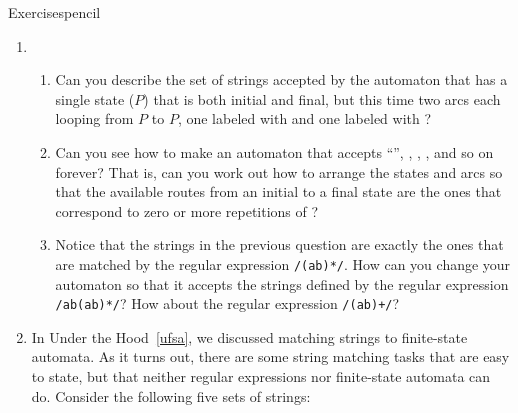 \begin{tblsfilledsymbol}{Exercises}{pencil}
\begin{enumerate}
\begin{enumerate}
    \begin{enumerate}
    \item \verb#egrep 'world.*August.*(holidays)?'#
    \item \verb#egrep 'august hol(i|y)days?'#
    \item \verb#egrep 'holidays|holy days in August'#
    \end{enumerate}
  \end{enumerate}

\item 
  \begin{enumerate}
  \item Can you describe the set of strings accepted by the automaton that has a single state ($P$) that is both initial and final, but  this time two arcs each looping from $P$ to $P$, one labeled with  and one labeled with ?

  \item Can you see how to make an automaton that accepts ``'',  , , , and so on forever? That is, can you   work out how to arrange the states and arcs so that the available     routes from an initial to a final state are the ones that     correspond to zero or more repetitions of ?

  \item Notice that the strings in the previous question are exactly  the ones that are matched by the regular expression     \texttt{/(ab)*/}. How can you change your automaton so that it     accepts the strings defined by the regular expression     \texttt{/ab(ab)*/}? How about the regular expression     \texttt{/(ab)+/}?

  \end{enumerate}

  \largerpage[3]
\item In Under the Hood~\ref{ufsa}, we discussed matching strings to finite-state automata.  As it turns out, there  are some string matching tasks that are easy to state, but that  neither regular expressions nor finite-state automata can do.   Consider the following five sets of strings:


\end{enumerate}
\end{tblsfilledsymbol}

